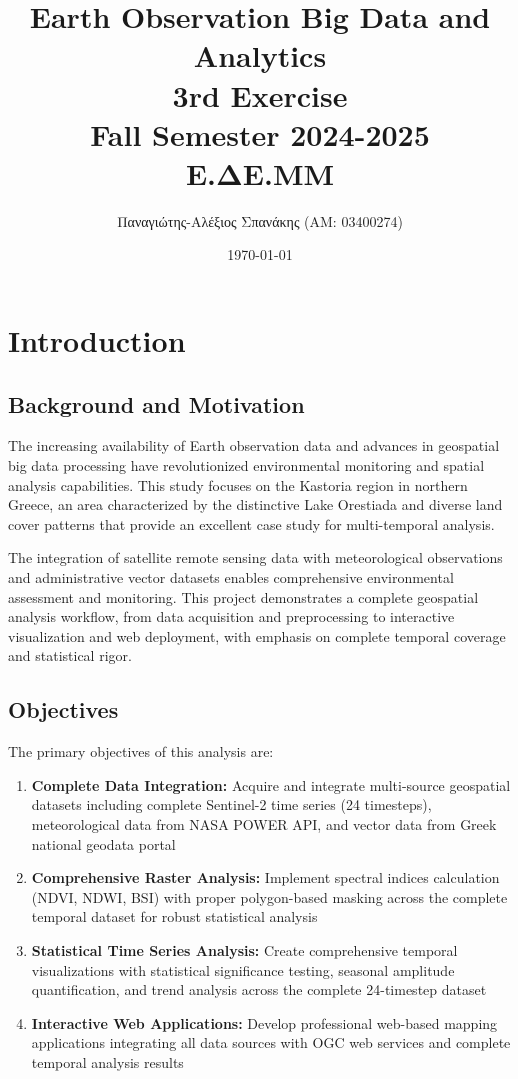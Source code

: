 \documentclass[a4paper,12pt]{article}
\title{Earth Observation Big Data and Analytics\\ 3rd Exercise \\ Fall Semester 2024-2025 \\ Ε.ΔE.ΜΜ}
\author{Παναγιώτης-Αλέξιος Σπανάκης (ΑΜ: 03400274)}
\date{\today}
\begin{document}
\maketitle

\tableofcontents
\newpage

\section{Introduction}

\subsection{Background and Motivation}

The increasing availability of Earth observation data and advances in
geospatial big data processing have revolutionized environmental monitoring and
spatial analysis capabilities. This study focuses on the Kastoria region in
northern Greece, an area characterized by the distinctive Lake Orestiada and
diverse land cover patterns that provide an excellent case study for
multi-temporal analysis.

The integration of satellite remote sensing data with meteorological
observations and administrative vector datasets enables comprehensive
environmental assessment and monitoring. This project demonstrates a complete
geospatial analysis workflow, from data acquisition and preprocessing to
interactive visualization and web deployment, with emphasis on complete temporal
coverage and statistical rigor.

\subsection{Objectives}

The primary objectives of this analysis are:

\begin{enumerate}
    \item \textbf{Complete Data Integration:} Acquire and integrate multi-source geospatial datasets including complete Sentinel-2 time series (24 timesteps), meteorological data from NASA POWER API, and vector data from Greek national geodata portal

    \item \textbf{Comprehensive Raster Analysis:} Implement spectral indices calculation (NDVI, NDWI, BSI) with proper polygon-based masking across the complete temporal dataset for robust statistical analysis

    \item \textbf{Statistical Time Series Analysis:} Create comprehensive temporal visualizations with statistical significance testing, seasonal amplitude quantification, and trend analysis across the complete 24-timestep dataset

    \item \textbf{Interactive Web Applications:} Develop professional web-based mapping applications integrating all data sources with OGC web services and complete temporal analysis results
\end{enumerate}
\end{document}
